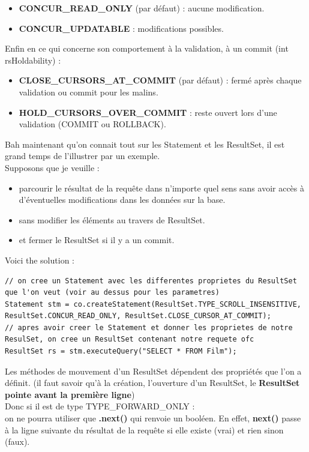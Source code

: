 \documentclass{report}
\begin{document}
\begin{itemize}
\item \textbf{CONCUR\_READ\_ONLY} (par défaut) : aucune modification.
\item \textbf{CONCUR\_UPDATABLE} : modifications possibles.\\
\end{itemize}
Enfin en ce qui concerne son comportement à la validation, à un commit (int rsHoldability) :
\begin{itemize}
\item \textbf{CLOSE\_CURSORS\_AT\_COMMIT} (par défaut) : fermé après chaque validation ou commit pour les malins.
\item \textbf{HOLD\_CURSORS\_OVER\_COMMIT} : reste ouvert lors d'une validation (COMMIT ou ROLLBACK).
\end{itemize}
Bah maintenant qu'on connait tout sur les Statement et les ResultSet, il est grand temps de l'illustrer par un exemple.\\
Supposons que je veuille : 
\begin{itemize}
\item parcourir le résultat de la requête dans n'importe quel sens sans avoir accès à d'éventuelles modifications dans les données sur la base.
\item sans modifier les éléments au travers de ResultSet.
\item et fermer le ResultSet si il y a un commit.\\
\end{itemize}
Voici the solution :
\begin{lstlisting}[style=MyJavaStyle]
// on cree un Statement avec les differentes proprietes du ResultSet que l'on veut (voir au dessus pour les parametres)
Statement stm = co.createStatement(ResultSet.TYPE_SCROLL_INSENSITIVE, ResultSet.CONCUR_READ_ONLY, ResultSet.CLOSE_CURSOR_AT_COMMIT);
// apres avoir creer le Statement et donner les proprietes de notre ResulSet, on cree un ResultSet contenant notre requete ofc
ResultSet rs = stm.executeQuery("SELECT * FROM Film");
\end{lstlisting}
Les méthodes de mouvement d'un ResultSet dépendent des propriétés que l'on a définit. (il faut savoir qu'à la création, l'ouverture d'un ResultSet, le \textbf{ResultSet pointe avant la première ligne})\\
Donc si il est de type TYPE\_FORWARD\_ONLY :\\
on ne pourra utiliser que \textbf{.next()} qui renvoie un booléen. En effet, \textbf{next()} passe à la ligne suivante du résultat de la requête si elle existe (vrai) et rien sinon (faux).\\
\end{document}
